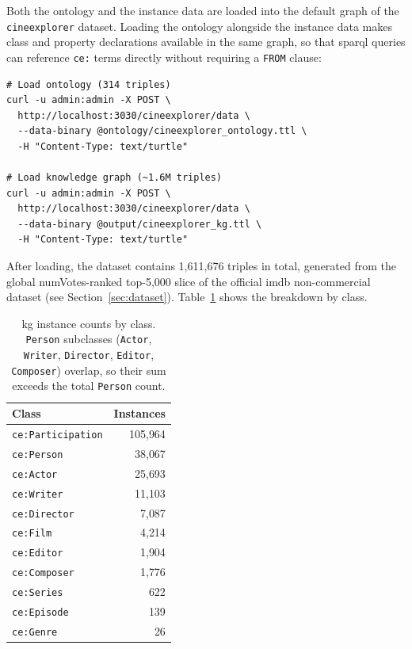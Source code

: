 Both the ontology and the instance data are loaded into the default graph of the \texttt{cineexplorer} dataset. Loading the ontology alongside the instance data makes class and property declarations available in the same graph, so that \ac{sparql} queries can reference \texttt{ce:} terms directly without requiring a \texttt{FROM} clause:

\begin{verbatim}
# Load ontology (314 triples)
curl -u admin:admin -X POST \
  http://localhost:3030/cineexplorer/data \
  --data-binary @ontology/cineexplorer_ontology.ttl \
  -H "Content-Type: text/turtle"

# Load knowledge graph (~1.6M triples)
curl -u admin:admin -X POST \
  http://localhost:3030/cineexplorer/data \
  --data-binary @output/cineexplorer_kg.ttl \
  -H "Content-Type: text/turtle"
\end{verbatim}

After loading, the dataset contains 1{,}611{,}676 triples in total, generated from the global numVotes-ranked top-5{,}000 slice of the official \ac{imdb} non-commercial dataset (see Section~\ref{sec:dataset}). Table~\ref{tab:kg-counts} shows the breakdown by class.

\begin{table}[H]
\centering
\begin{tabular}{lr}
\hline
\textbf{Class} & \textbf{Instances} \\
\hline
\texttt{ce:Participation} & 105{,}964 \\
\texttt{ce:Person}        & 38{,}067  \\
\texttt{ce:Actor}         & 25{,}693  \\
\texttt{ce:Writer}        & 11{,}103  \\
\texttt{ce:Director}      & 7{,}087   \\
\texttt{ce:Film}          & 4{,}214   \\
\texttt{ce:Editor}        & 1{,}904   \\
\texttt{ce:Composer}      & 1{,}776   \\
\texttt{ce:Series}        & 622       \\
\texttt{ce:Episode}       & 139       \\
\texttt{ce:Genre}         & 26        \\
\hline
\end{tabular}
\caption{\ac{kg} instance counts by class. \texttt{Person} subclasses (\texttt{Actor}, \texttt{Writer}, \texttt{Director}, \texttt{Editor}, \texttt{Composer}) overlap, so their sum exceeds the total \texttt{Person} count.}
\label{tab:kg-counts}
\end{table}

